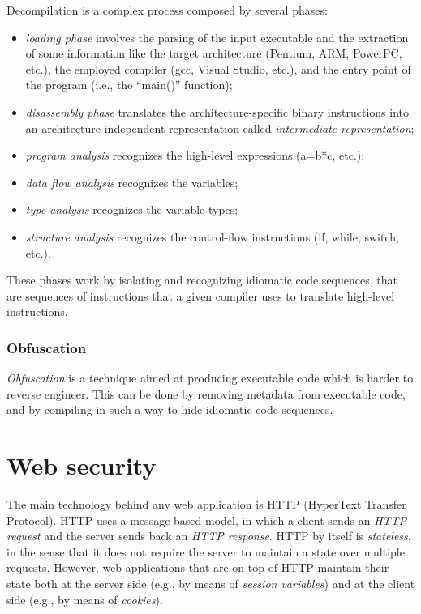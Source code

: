 \documentclass[a4paper,12pt]{article}
\begin{document}
Decompilation is a complex process composed by several phases: 
\begin{itemize}
	\item \textit{loading phase} involves the parsing of the input executable and the extraction of some information like the target architecture (Pentium, ARM, PowerPC, etc.), the employed compiler (gcc, Visual Studio, etc.), and the entry point of the program (i.e., the “main()” function);
	\item \textit{disassembly phase} translates the architecture-specific binary instructions into an architecture-independent representation called \textit{intermediate representation};
	\item \textit{program analysis} recognizes the high-level expressions (a=b*c, etc.);
	\item \textit{data flow analysis} recognizes the variables;
	\item \textit{type analysis} recognizes the variable types;
	\item \textit{structure analysis} recognizes the control-flow instructions (if, while, switch, etc.).
\end{itemize}

These phases work by isolating and recognizing idiomatic code sequences, that are sequences of instructions that a given compiler uses to translate high-level instructions.

\subsubsection{Obfuscation}
\textit{Obfuscation} is a technique aimed at producing executable code which is harder to reverse engineer. This can be done by removing metadata from executable code, and by compiling in such a way to hide idiomatic code sequences.

\newpage

\section{Web security}
The main technology behind any web application is HTTP (HyperText Transfer Protocol). HTTP uses a message-based model, in which a client sends an \textit{HTTP request} and the server sends back an \textit{HTTP response}. HTTP by itself is \textit{stateless}, in the sense that it does not require the server to maintain a state over multiple requests. However, web applications that are on top of HTTP maintain their state both at the server side (e.g., by means of \textit{session variables}) and at the client side (e.g., by means of \textit{cookies}).
\end{document}
